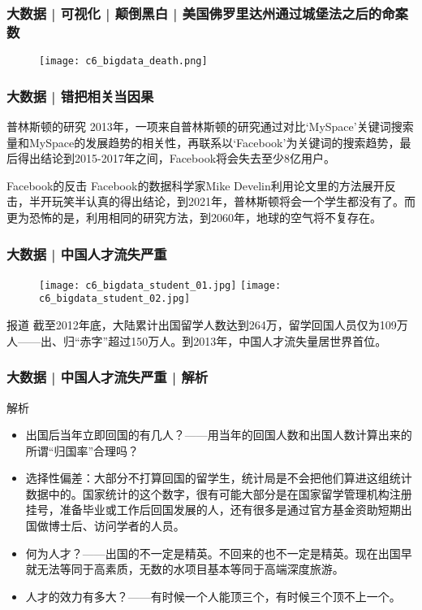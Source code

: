 \begin{frame}
  \frametitle{大数据 | 可视化 | 颠倒黑白 | 美国佛罗里达州通过城堡法之后的命案数}
  \begin{figure}
    \centering
    \texttt{[image: c6\_bigdata\_death.png]}
  \end{figure}
\end{frame}

\begin{frame}
  \frametitle{大数据 | 错把相关当因果}
  \begin{block}{普林斯顿的研究}
    2013年，一项来自普林斯顿的研究通过对比`MySpace'关键词搜索量和MySpace的发展趋势的相关性，再联系以`Facebook'为关键词的搜索趋势，最后得出结论到2015-2017年之间，Facebook将会失去至少8亿用户。
  \end{block}
  \pause
  \begin{block}{Facebook的反击}
    Facebook的数据科学家Mike Develin利用论文里的方法展开反击，半开玩笑半认真的得出结论，到2021年，普林斯顿将会一个学生都没有了。而更为恐怖的是，利用相同的研究方法，到2060年，地球的空气将不复存在。
  \end{block}
\end{frame}

\begin{frame}
  \frametitle{大数据 | 中国人才流失严重}
  \begin{figure}
    \centering
    \texttt{[image: c6\_bigdata\_student\_01.jpg]}
    \texttt{[image: c6\_bigdata\_student\_02.jpg]}
  \end{figure}
  \begin{block}{报道}
    截至2012年底，大陆累计出国留学人数达到264万，留学回国人员仅为109万人——出、归“赤字”超过150万人。到2013年，中国人才流失量居世界首位。
  \end{block}
\end{frame}

\begin{frame}
  \frametitle{大数据 | 中国人才流失严重 | 解析}
  \begin{block}{解析}
    \begin{itemize}
      \item 出国后当年立即回国的有几人？——用当年的回国人数和出国人数计算出来的所谓“归国率”合理吗？
      \item 选择性偏差：大部分不打算回国的留学生，统计局是不会把他们算进这组统计数据中的。国家统计的这个数字，很有可能大部分是在国家留学管理机构注册挂号，准备毕业或工作后回国发展的人，还有很多是通过官方基金资助短期出国做博士后、访问学者的人员。
      \item 何为人才？——出国的不一定是精英。不回来的也不一定是精英。现在出国早就无法等同于高素质，无数的水项目基本等同于高端深度旅游。
      \item 人才的效力有多大？——有时候一个人能顶三个，有时候三个顶不上一个。
    \end{itemize}
  \end{block}
\end{frame}

